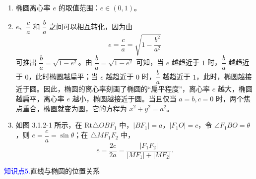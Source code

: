 \documentclass{article}
\begin{document}
\begin{tcolorbox}[colback=blue!10,colframe=blue!70!black,title=深度剖析椭圆离心率的范围、几何意义及其他表示方式]
\begin{enumerate}
    \item 椭圆离心率 \(e\) 的取值范围：\(e \in (0,1)\)。
    \item \(e\)、\(\dfrac{c}{a}\) 和 \(\dfrac{b}{a}\) 之间可以相互转化，因为由
    \[
    e = \frac{c}{a} = \sqrt{1 - \frac{b^2}{a^2}}
    \]
    可推出 \(\dfrac{b}{a} = \sqrt{1 - e^2}\)。由 \(\dfrac{b}{a} = \sqrt{1 - e^2}\) 可知，当 \(e\) 越趋近于 \(1\) 时，\(\dfrac{b}{a}\) 越趋近于 \(0\)，此时椭圆越扁平；当 \(e\) 越趋近于 \(0\) 时，\(\dfrac{b}{a}\) 越趋近于 \(1\)，此时，椭圆越接近于圆。因此，椭圆的离心率刻画了椭圆的“扁平程度”，离心率 \(e\) 越大，椭圆越扁平，离心率 \(e\) 越小，椭圆越接近于圆。当且仅当 \(a = b, c = 0\) 时，两个焦点重合，椭圆就变为圆，它的方程为 \(x^2 + y^2 = a^2\)。
    \item 如图 3.1.2-1 所示，在 \(\text{Rt}\triangle OBF_1\) 中，\(|BF_1| = a\)，\(|F_1O| = c\)，令 \(\angle F_1BO = \theta\)，则 \(e = \dfrac{c}{a} = \sin\theta\)；在 \(\triangle MF_1F_2\) 中，
    \[
    e = \frac{2c}{2a} = \frac{|F_1F_2|}{|MF_1| + |MF_2|}.
    \]
    \begin{center}
    \end{center}
\end{enumerate}
\end{tcolorbox}
\vspace{1\baselineskip}

\;\;\;\;\textcolor{blue}{知识点5.}直线与椭圆的位置关系
\vspace{1\baselineskip}
\end{document}
